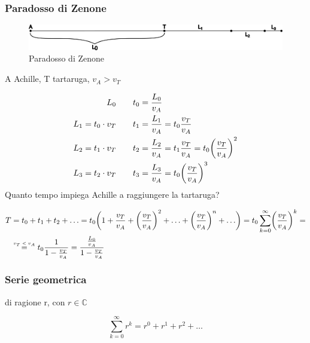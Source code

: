 \subsubsection{Paradosso di Zenone} 
\begin{figure}[!h]
	\centering
	\includegraphics[width=0.7\linewidth]{serie_numeriche/zenone.png}
	\caption{Paradosso di Zenone}
	\label{fig:zenone}
\end{figure}

A Achille, T tartaruga, $v_A>v_T$ 

\begin{align*}
\centering
L_0 & \qquad t_0 = \frac{L_0}{v_A} 
\\
L_1=t_0\cdot v_T & \qquad t_1=\frac{L_1}{v_A} = t_0\frac{v_T}{v_A}
\\
L_2=t_1\cdot v_T & \qquad t_2=\frac{L_2}{v_A} = t_1 \frac{v_T}{v_A} = t_0 \biggl( \frac{v_T}{v_A} \biggr) ^2 
\\
L_3=t_2\cdot v_T & \qquad t_3=\frac{L_3}{v_A} =  t_0 \biggl( \frac{v_T}{v_A} \biggr) ^3
\end{align*}
Quanto tempo impiega Achille a raggiungere la tartaruga?

\newcommand\zenone{\stackrel{\mbox{\tiny{$v_T<v_A$}}}{=}}

\begin{align*}
	T   &= t_0 + t_1 + t_2 + \ldots = t_0 \biggl(1 + \frac{v_T}{v_A} + \biggl(\frac{v_T}{v_A}\biggr)^2 + \ldots + \biggl(\frac{v_T}{v_A}\biggr)^n + \ldots \biggr)	= t_0 \sum_{k=0}^\infty \biggl(\frac{v_T}{v_A}\biggr)^k = \\
	&\zenone t_0 \frac{1}{1-\frac{v_T}{v_A}} = \frac{\frac{L_0}{v_A}}{1-\frac{v_T}{v_A}}
\end{align*}

\subsubsection{Serie geometrica} di ragione r, con $r\in\mathbb{C}$

\begin{equation*}
	\sum_{k=0}^\infty r^k = r^0 + r^1 + r^2 + \ldots
\end{equation*}

